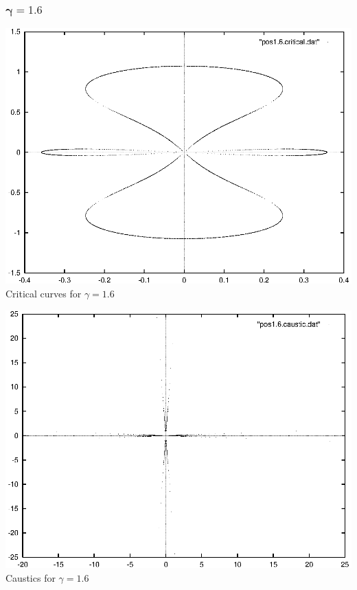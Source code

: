 \documentclass[a4paper]{IEEEtran}
\begin{document}
    \subsubsection{$\mathbf{\gamma = 1.6}$}
    \begin{center}
        \includegraphics[width=\columnwidth]{images/pos1-6-critical.eps} 
        \\[1mm]
         Critical curves for $\gamma = 1.6$
    \end{center}
    \begin{center}
        \includegraphics[width=\columnwidth]{images/pos1-6-caustic.eps} 
        \\[1mm]
         Caustics for $\gamma = 1.6$
    \end{center}
\end{document}
